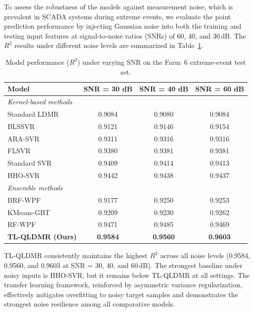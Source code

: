 \documentclass[a4paper]{cas-sc}
\begin{document}
To assess the robustness of the models against measurement noise, which is prevalent in SCADA systems during extreme events, we evaluate the point prediction performance by injecting Gaussian noise into both the training and testing input features at signal-to-noise ratios (SNRs) of 60, 40, and 30\,dB.
The $R^2$ results under different noise levels are summarized in Table~\ref{tab:exp2_noise}.

\begin{table}[ht]
\centering
\caption{Model performance ($R^2$) under varying SNR on the Farm~6 extreme-event test set.}
\setlength{\tabcolsep}{3.5mm}
\begin{tabular}{lccc}
\toprule
Model & SNR = 30 dB & SNR = 40 dB & SNR = 60 dB \\
\midrule
\multicolumn{4}{l}{\textit{Kernel-based methods}} \\
Standard LDMR & 0.9084 & 0.9080 & 0.9084 \\
BLSSVR        & 0.9121 & 0.9146 & 0.9154 \\
ARA-SVR       & 0.9311 & 0.9316 & 0.9316 \\
FLSVR         & 0.9380 & 0.9381 & 0.9381 \\
Standard SVR  & 0.9409 & 0.9414 & 0.9413 \\
HHO-SVR       & 0.9442 & 0.9438 & 0.9437 \\
\midrule
\multicolumn{4}{l}{\textit{Ensemble methods}} \\
BRF-WPF       & 0.9177 & 0.9250 & 0.9253 \\
KMeans-GBT    & 0.9209 & 0.9230 & 0.9262 \\
RF-WPF        & 0.9471 & 0.9485 & 0.9469 \\
\midrule
\textbf{TL-QLDMR (Ours)} & \textbf{0.9584} & \textbf{0.9560} & \textbf{0.9603} \\
\bottomrule
\end{tabular}
\label{tab:exp2_noise}
\end{table}

TL-QLDMR consistently maintains the highest $R^2$ across all noise levels (0.9584, 0.9560, and 0.9603 at SNR = 30, 40, and 60\,dB). The strongest baseline under noisy inputs is HHO-SVR, but it remains below TL-QLDMR at all settings. The transfer learning framework, reinforced by asymmetric variance regularization, effectively mitigates overfitting to noisy target samples and demonstrates the strongest noise resilience among all comparative models.

\end{document}
